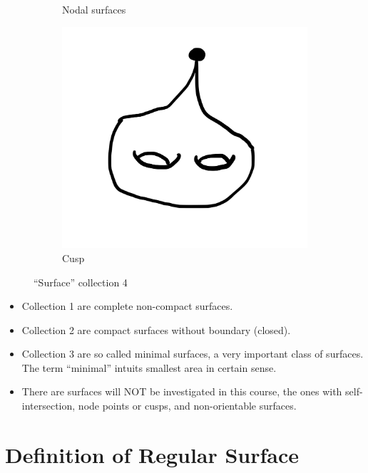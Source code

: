 \begin{figure}
\begin{subfigure}{0.35\textwidth}
    \caption{Nodal surfaces}
\end{subfigure}
\begin{subfigure}{0.3\textwidth}
    \centering
    \includegraphics[width=\textwidth]{picture/week4/cusp.png}
    \caption{Cusp}
\end{subfigure}
\caption*{``Surface'' collection 4}
\end{figure}

\begin{example}\hfill
\begin{itemize}
    \item Collection 1 are complete non-compact surfaces.
    \item Collection 2 are compact surfaces without boundary (closed).
    \item Collection 3 are so called minimal surfaces, a very important class
        of surfaces. The term ``minimal'' intuits smallest area in certain sense.
    \item There are surfaces will NOT be investigated in this course, the ones with
        self-intersection, node points or cusps, and non-orientable surfaces.
\end{itemize}    
\end{example}

\section{Definition of Regular Surface}

